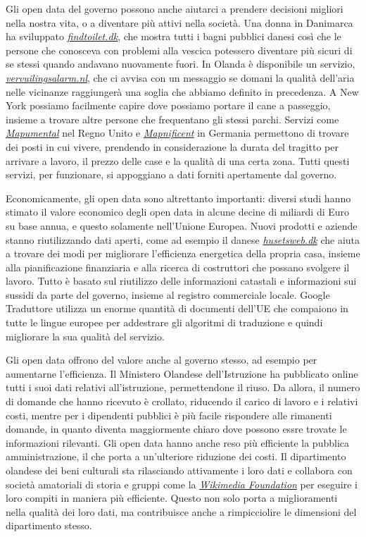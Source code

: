 Gli open data del governo possono anche aiutarci a prendere decisioni migliori nella nostra vita, o a diventare più attivi nella società. Una donna in Danimarca ha sviluppato \textit{\href{https://beta.findtoilet.dk/}{findtoilet.dk}}, che mostra tutti i bagni pubblici danesi così che le persone che conosceva con problemi alla vescica potessero diventare più sicuri di se stessi quando andavano nuovamente fuori. In Olanda è disponibile un servizio, \textit{\href{https://pmc.ncbi.nlm.nih.gov/articles/PMC10097618/}{vervuilingsalarm.nl}}, che ci avvisa con un messaggio se domani la qualità dell'aria nelle vicinanze raggiungerà una soglia che abbiamo definito in precedenza. A New York possiamo facilmente capire dove possiamo portare il cane a passeggio, insieme a trovare altre persone che frequentano gli stessi parchi. Servizi come \textit{\href{https://en.wikipedia.org/wiki/Mapumental}{Mapumental}} nel Regno Unito e \textit{\href{https://www.mapnificent.net/}{Mapnificent}} in Germania permettono di trovare dei posti in cui vivere, prendendo in considerazione la durata del tragitto per arrivare a lavoro, il prezzo delle case e la qualità di una certa zona. Tutti questi servizi, per funzionare, si appoggiano a dati forniti apertamente dal governo.

Economicamente, gli open data sono altrettanto importanti: diversi studi hanno stimato il valore economico degli open data in alcune decine di miliardi di Euro su base annua, e questo solamente nell'Unione Europea. Nuovi prodotti e aziende stanno riutilizzando dati aperti, come ad esempio il danese \textit{\href{https://husetsweb.dk/}{husetsweb.dk}} che aiuta a trovare dei modi per migliorare l'efficienza energetica della propria casa, insieme alla pianificazione finanziaria e alla ricerca di costruttori che possano svolgere il lavoro. Tutto è basato sul riutilizzo delle informazioni catastali e informazioni sui sussidi da parte del governo, insieme al registro commerciale locale. Google Traduttore utilizza un enorme quantità di documenti dell'UE che compaiono in tutte le lingue europee per addestrare gli algoritmi di traduzione e quindi migliorare la sua qualità del servizio.

Gli open data offrono del valore anche al governo stesso, ad esempio per aumentarne l'efficienza. Il Ministero Olandese dell'Istruzione ha pubblicato online tutti i suoi dati relativi all'istruzione, permettendone il riuso. Da allora, il numero di domande che hanno ricevuto è crollato, riducendo il carico di lavoro e i relativi costi, mentre per i dipendenti pubblici è più facile rispondere alle rimanenti domande, in quanto diventa maggiormente chiaro dove possono essre trovate le informazioni rilevanti. Gli open data hanno anche reso più efficiente la pubblica amministrazione, il che porta a un'ulteriore riduzione dei costi. Il dipartimento olandese dei beni culturali sta rilasciando attivamente i loro dati e collabora con società amatoriali di storia e gruppi come la \textit{\href{https://wikimediafoundation.org/}{Wikimedia Foundation}} per eseguire i loro compiti in maniera più efficiente. Questo non solo porta a miglioramenti nella qualità dei loro dati, ma contribuisce anche a rimpicciolire le dimensioni del dipartimento stesso.

